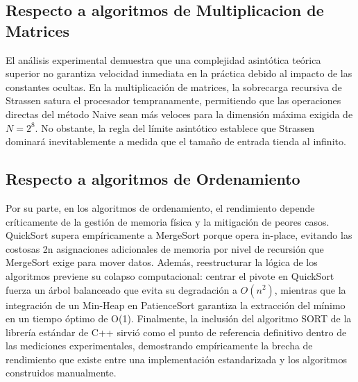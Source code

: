 \subsection{Respecto a  algoritmos de Multiplicacion de Matrices}
El análisis experimental demuestra que una complejidad asintótica teórica superior no garantiza velocidad inmediata en la práctica debido al impacto de las constantes ocultas. En la multiplicación de matrices, la sobrecarga recursiva de Strassen satura el procesador tempranamente, permitiendo que las operaciones directas del método Naive sean más veloces para la dimensión máxima exigida de $N=2^8$. No obstante, la regla del límite asintótico establece que Strassen dominará inevitablemente a medida que el tamaño de entrada tienda al infinito.

\subsection{Respecto a algoritmos de Ordenamiento}

Por su parte, en los algoritmos de ordenamiento, el rendimiento depende críticamente de la gestión de memoria física y la mitigación de peores casos. QuickSort supera empíricamente a MergeSort porque opera in-place, evitando las costosas 2n asignaciones adicionales de memoria por nivel de recursión que MergeSort exige para mover datos. Además, reestructurar la lógica de los algoritmos previene su colapso computacional: centrar el pivote en QuickSort fuerza un árbol balanceado que evita su degradación a $O(n^2)$, mientras que la integración de un Min-Heap en PatienceSort garantiza la extracción del mínimo en un tiempo óptimo de O(1). Finalmente, la inclusión del algoritmo SORT de la librería estándar de C++ sirvió como el punto de referencia definitivo dentro de las mediciones experimentales, demostrando empíricamente la brecha de rendimiento que existe entre una implementación estandarizada y los algoritmos construidos manualmente.